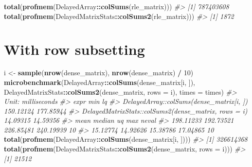 \documentclass[]{book}
\newenvironment{Shaded}{\begin{snugshade}}{\end{snugshade}}
\newcommand{\KeywordTok}[1]{\textcolor[rgb]{0.13,0.29,0.53}{\textbf{#1}}}
\newcommand{\DataTypeTok}[1]{\textcolor[rgb]{0.13,0.29,0.53}{#1}}
\newcommand{\DecValTok}[1]{\textcolor[rgb]{0.00,0.00,0.81}{#1}}
\newcommand{\StringTok}[1]{\textcolor[rgb]{0.31,0.60,0.02}{#1}}
\newcommand{\CommentTok}[1]{\textcolor[rgb]{0.56,0.35,0.01}{\textit{#1}}}
\newcommand{\OperatorTok}[1]{\textcolor[rgb]{0.81,0.36,0.00}{\textbf{#1}}}
\newcommand{\NormalTok}[1]{#1}
\begin{document}
\begin{Shaded}
\begin{Highlighting}[]
\KeywordTok{total}\NormalTok{(}\KeywordTok{profmem}\NormalTok{(DelayedArray}\OperatorTok{::}\KeywordTok{colSums}\NormalTok{(rle_matrix)))}
\CommentTok{#> [1] 787403608}
\KeywordTok{total}\NormalTok{(}\KeywordTok{profmem}\NormalTok{(DelayedMatrixStats}\OperatorTok{::}\KeywordTok{colSums2}\NormalTok{(rle_matrix)))}
\CommentTok{#> [1] 1872}
\end{Highlighting}
\end{Shaded}

\section{With row subsetting}\label{with-row-subsetting}

\begin{Shaded}
\begin{Highlighting}[]
\NormalTok{i <-}\StringTok{ }\KeywordTok{sample}\NormalTok{(}\KeywordTok{nrow}\NormalTok{(dense_matrix), }\KeywordTok{nrow}\NormalTok{(dense_matrix) }\OperatorTok{/}\StringTok{ }\DecValTok{10}\NormalTok{)}
\KeywordTok{microbenchmark}\NormalTok{(DelayedArray}\OperatorTok{::}\KeywordTok{colSums}\NormalTok{(dense_matrix[i, ]),}
\NormalTok{               DelayedMatrixStats}\OperatorTok{::}\KeywordTok{colSums2}\NormalTok{(dense_matrix, }\DataTypeTok{rows =}\NormalTok{ i),}
               \DataTypeTok{times =}\NormalTok{ times)}
\CommentTok{#> Unit: milliseconds}
\CommentTok{#>                                                  expr       min        lq}
\CommentTok{#>              DelayedArray::colSums(dense_matrix[i, ]) 150.12124 177.85944}
\CommentTok{#>  DelayedMatrixStats::colSums2(dense_matrix, rows = i)  14.09315  14.59356}
\CommentTok{#>       mean    median        uq       max neval}
\CommentTok{#>  198.11233 192.73521 226.85481 240.19939    10}
\CommentTok{#>   15.12774  14.92626  15.38786  17.04865    10}
\KeywordTok{total}\NormalTok{(}\KeywordTok{profmem}\NormalTok{(DelayedArray}\OperatorTok{::}\KeywordTok{colSums}\NormalTok{(dense_matrix[i, ])))}
\CommentTok{#> [1] 326614368}
\KeywordTok{total}\NormalTok{(}\KeywordTok{profmem}\NormalTok{(DelayedMatrixStats}\OperatorTok{::}\KeywordTok{colSums2}\NormalTok{(dense_matrix, }\DataTypeTok{rows =}\NormalTok{ i)))}
\CommentTok{#> [1] 21512}


\end{Highlighting}
\end{Shaded}
\end{document}
